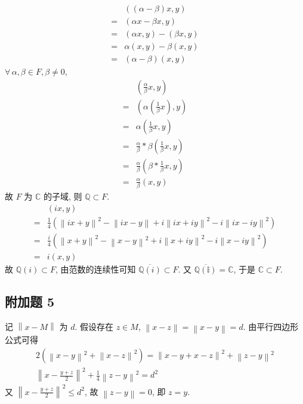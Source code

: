 \documentclass[../main.tex]{subfiles}
\begin{document}
\begin{align*}
     & \left( \left( \alpha - \beta \right) x , y \right) \\
    =& \left( \alpha x - \beta x , y \right) \\
    =& \left( \alpha x, y \right) - \left( \beta x, y \right) \\
    =& \alpha \left( x, y \right) - \beta \left( x, y \right) \\
    =& \left( \alpha - \beta \right) \left( x, y \right)
\end{align*}
$\forall \, \alpha, \beta \in F, \beta \neq 0$,
\begin{align*}
     & \left( \frac{\alpha}{\beta} x, y \right) \\
    =& \left( \alpha \left( \frac{1}{\beta} x \right) , y \right) \\
    =& \alpha \left( \frac{1}{\beta} x , y \right) \\
    =& \frac{\alpha}{\beta} * \beta \left( \frac{1}{\beta} x, y \right) \\
    =& \frac{\alpha}{\beta} \left( \beta * \frac{1}{\beta} x, y \right) \\
    =& \frac{\alpha}{\beta} \left( x, y \right)
\end{align*}
故 $F$ 为 $\mathbb{C}$ 的子域, 则 $\mathbb{Q} \subset F$.
\begin{align*}
     & \left( i x, y \right) \\
    =& \frac{1}{4} \left( \left\| i x + y \right\|^2 - \left\| ix - y \right\| + i \left\| i x + i y \right\|^2 - i \left\| i x - i y \right\|^2 \right) \\
    =& \frac{i}{4} \left( \left\| x + y \right\|^2 - \left\| x - y \right\|^2 + i \left\| x + i y \right\|^2 - i \left\| x - i y \right\|^2 \right) \\
    =& i \left( x, y \right)
\end{align*}
故 $\mathbb{Q} \left( i \right) \subset F$, 由范数的连续性可知 $\overline{\mathbb{Q} \left( i \right)} \subset F$.
又 $\overline{\mathbb{Q \left( i \right)}} = \mathbb{C}$, 于是 $\mathbb{C} \subset F$.

\subsection{附加题 5}
记 $\left\| x - M \right\|$ 为 $d$.
假设存在 $z \in M$, $\left\| x - z \right\| = \left\| x - y \right\| = d$.
由平行四边形公式可得
\begin{gather*}
    2 \left( \left\| x - y \right\|^2 + \left\| x - z \right\|^2 \right)
    =
    \left\| x - y + x - z \right\|^2 + \left\| z - y \right\|^2 \\
    \left\| x - \frac{y + z}{2} \right\|^2 + \frac{1}{4} \left\| z - y \right\|^2
    =
    d^2
\end{gather*}
又 $\left\| x - \displaystyle \frac{y + z}{2} \right\|^2 \leqslant d^2$, 故 $\left\| z - y \right\| = 0$, 即 $z = y$.
\end{document}
